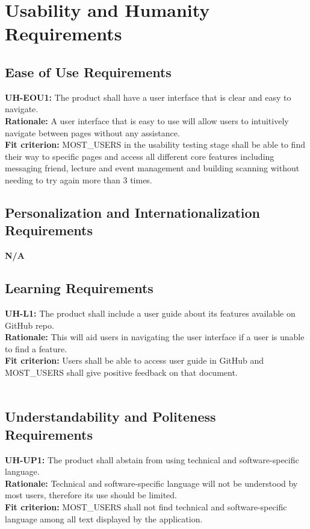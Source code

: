 \documentclass[12pt]{article}
\begin{document}
\section{Usability and Humanity Requirements}
\subsection{Ease of Use Requirements}
  \textbf{UH-EOU1:} The product shall have a user interface that is clear and easy to navigate.\\
  \textbf{Rationale:} A user interface that is easy to use will allow users to intuitively navigate between pages without any assistance.\\
  \textbf{Fit criterion:} MOST\_USERS in the usability testing stage shall be able to find their way to specific pages and access all different core features including messaging friend, lecture and event management and building scanning without needing to try again more than 3 times.\\

\subsection{Personalization and Internationalization Requirements}
  \textbf{N/A}\\

\subsection{Learning Requirements}
  \textbf{UH-L1:} The product shall include a user guide about its features available on GitHub repo.\\
  \textbf{Rationale:} This will aid users in navigating the user interface if a user is unable to find a feature.\\
  \textbf{Fit criterion:} Users shall be able to access user guide in GitHub and MOST\_USERS shall give positive feedback on that document.\\\\

\subsection{Understandability and Politeness Requirements}
  \textbf{UH-UP1:} The product shall abstain from using technical and software-specific language.\\
  \textbf{Rationale:} Technical and software-specific language will not be understood by most users, therefore its use should be limited.\\
  \textbf{Fit criterion:} MOST\_USERS shall not find technical and software-specific language among all text displayed by the application.\\
\end{document}
